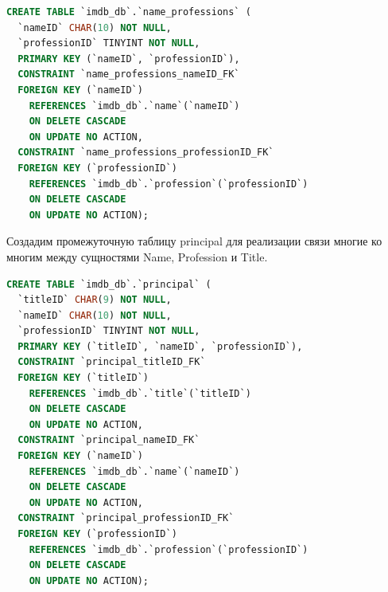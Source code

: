 \documentclass[12pt,a4paper]{article}
\begin{document}
\begin{lstlisting}[language=SQL]
CREATE TABLE `imdb_db`.`name_professions` (
  `nameID` CHAR(10) NOT NULL,
  `professionID` TINYINT NOT NULL,
  PRIMARY KEY (`nameID`, `professionID`),
  CONSTRAINT `name_professions_nameID_FK` 
  FOREIGN KEY (`nameID`)
    REFERENCES `imdb_db`.`name`(`nameID`)
    ON DELETE CASCADE
    ON UPDATE NO ACTION,
  CONSTRAINT `name_professions_professionID_FK` 
  FOREIGN KEY (`professionID`)
    REFERENCES `imdb_db`.`profession`(`professionID`)
    ON DELETE CASCADE
    ON UPDATE NO ACTION);
\end{lstlisting}

Создадим промежуточную таблицу principal для реализации связи 
многие ко многим между сущностями Name, Profession и Title.

\begin{lstlisting}[language=SQL]
CREATE TABLE `imdb_db`.`principal` (
  `titleID` CHAR(9) NOT NULL,
  `nameID` CHAR(10) NOT NULL,
  `professionID` TINYINT NOT NULL,
  PRIMARY KEY (`titleID`, `nameID`, `professionID`),
  CONSTRAINT `principal_titleID_FK` 
  FOREIGN KEY (`titleID`)
    REFERENCES `imdb_db`.`title`(`titleID`)
    ON DELETE CASCADE
    ON UPDATE NO ACTION,
  CONSTRAINT `principal_nameID_FK` 
  FOREIGN KEY (`nameID`)
    REFERENCES `imdb_db`.`name`(`nameID`)
    ON DELETE CASCADE
    ON UPDATE NO ACTION,
  CONSTRAINT `principal_professionID_FK` 
  FOREIGN KEY (`professionID`)
    REFERENCES `imdb_db`.`profession`(`professionID`)
    ON DELETE CASCADE
    ON UPDATE NO ACTION);      
\end{lstlisting}
\end{document}
